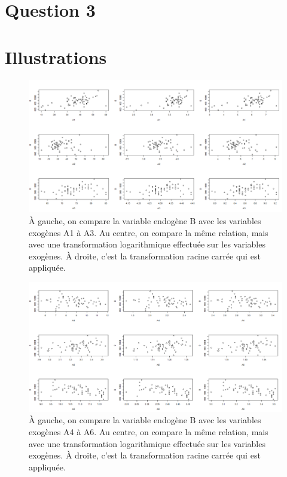 \documentclass{article}
\begin{document}
\section{Question 3}
	
	\appendix
	\section{Illustrations}
	\begin{figure}[H]
		\includegraphics[width=\textwidth]{graphiques/Qst1_transformations_1}
		\caption{À gauche, on compare la variable endogène B avec les variables exogènes A1 à A3. Au centre, on compare la même relation, mais avec une transformation logarithmique effectuée sur les variables exogènes. À droite, c'est la transformation racine carrée qui est appliquée.}
		\label{Qst1_transformations_1}
	\end{figure}
	\begin{figure}[H]
		\includegraphics[width=\textwidth]{graphiques/Qst1_transformations_2}
		\caption{À gauche, on compare la variable endogène B avec les variables exogènes A4 à A6. Au centre, on compare la même relation, mais avec une transformation logarithmique effectuée sur les variables exogènes. À droite, c'est la transformation racine carrée qui est appliquée.}
		\label{Qst1_transformations_2}
	\end{figure}
\end{document}
